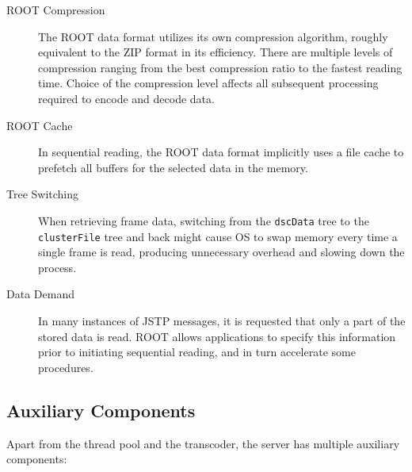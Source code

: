 \begin{description}
	\item[ROOT Compression]
	The ROOT data format utilizes its own compression algorithm, roughly equivalent to the ZIP format in its efficiency. There are multiple levels of compression ranging from the best compression ratio to the fastest reading time. Choice of the compression level affects all subsequent processing required to encode and decode data.

	\item[ROOT Cache]
	In sequential reading, the ROOT data format implicitly uses a file cache to prefetch all buffers for the selected data in the memory.

	\item[Tree Switching]
	When retrieving frame data, switching from the \texttt{dscData} tree to the \texttt{clusterFile} tree and back might cause OS to swap memory every time a single frame is read, producing unnecessary overhead and slowing down the process.

	\item[Data Demand]
	In many instances of JSTP messages, it is requested that only a part of the stored data is read. ROOT allows applications to specify this information prior to initiating sequential reading, and in turn accelerate some procedures.
\end{description}

\subsection{Auxiliary Components}
Apart from the thread pool and the transcoder, the server has multiple auxiliary components:

